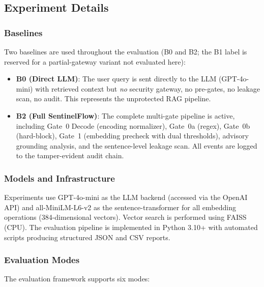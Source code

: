 \documentclass[journal]{IEEEtran}
\begin{document}
\subsection{Experiment Details}
\label{Sect:Experiment_Details}

\subsubsection{Baselines}

Two baselines are used throughout the evaluation (B0 and B2; the B1 label is reserved for a partial-gateway variant not evaluated here):

\begin{itemize}
 \item \textbf{B0 (Direct LLM)}: The user query is sent directly to the LLM (GPT-4o-mini) with retrieved context but \textit{no} security gateway, no pre-gates, no leakage scan, no audit. This represents the unprotected RAG pipeline.
    \item \textbf{B2 (Full SentinelFlow)}: The complete multi-gate pipeline is active, including Gate~0 Decode (encoding normalizer), Gate~0a (regex), Gate~0b (hard-block), Gate~1 (embedding precheck with dual thresholds), advisory grounding analysis, and the sentence-level leakage scan. All events are logged to the tamper-evident audit chain.
\end{itemize}

\subsubsection{Models and Infrastructure}

Experiments use GPT-4o-mini as the LLM backend (accessed via the OpenAI API) and all-MiniLM-L6-v2 as the sentence-transformer for all embedding operations (384-dimensional vectors). Vector search is performed using FAISS (CPU). The evaluation pipeline is implemented in Python 3.10+ with automated scripts producing structured JSON and CSV reports.

\subsubsection{Evaluation Modes}

The evaluation framework supports six modes:
\end{document}
